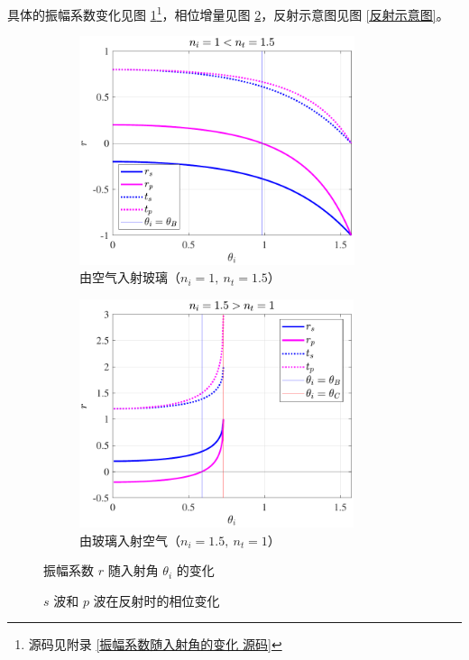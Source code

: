 \documentclass[UTF8]{report}
\theoremstyle{MyLineTheoremStyle} %
\theoremstyle{MyBlockTheoremStyle} %
\theoremstyle{MySubsubsectionStyle} %
\begin{document}
具体的振幅系数变化见图 \ref{振幅系数随入射角的变化}\footnote{源码见附录 \ref{振幅系数随入射角的变化 源码}}，相位增量见图 \ref{反射时 s 波和 p 波的相位变化}，反射示意图见图 \ref{反射示意图}。

\begin{figure}[H]\centering
\begin{subfigure}[t]{0.49\textwidth}\centering
    \includegraphics[height=190pt]{assets/1,2/2024-09-15_10-53-31.pdf}
    \caption{ 由空气入射玻璃（$n_i = 1,\ n_t = 1.5$） }
\end{subfigure}
\begin{subfigure}[t]{0.49\textwidth}\centering
    \includegraphics[height=190pt]{assets/1,2/2024-09-15_10-53-27.pdf}
    \caption{ 由玻璃入射空气（$n_i = 1.5,\ n_t = 1$） }
\end{subfigure}
\caption{ 振幅系数 $r$ 随入射角 $\theta_i$ 的变化 }\label{振幅系数随入射角的变化}
\end{figure}

\begin{figure}[ht]\centering
    
    \caption{ $s$ 波和 $p$ 波在反射时的相位变化}\label{反射时 s 波和 p 波的相位变化}
\end{figure}
\end{document}
